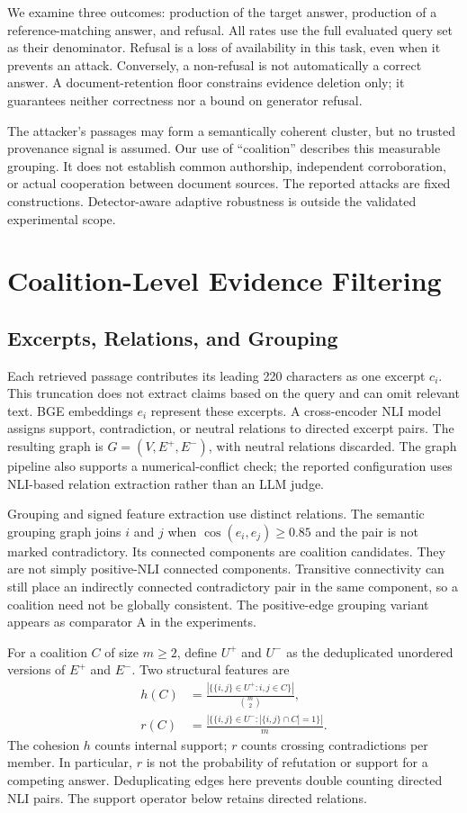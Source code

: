 \documentclass[sigconf]{aamas}
\begin{document}
We examine three outcomes: production of the target answer, production of a reference-matching answer, and refusal. All rates use the full evaluated query set as their denominator. Refusal is a loss of availability in this task, even when it prevents an attack. Conversely, a non-refusal is not automatically a correct answer. A document-retention floor constrains evidence deletion only; it guarantees neither correctness nor a bound on generator refusal.

The attacker's passages may form a semantically coherent cluster, but no trusted provenance signal is assumed. Our use of ``coalition'' describes this measurable grouping. It does not establish common authorship, independent corroboration, or actual cooperation between document sources. The reported attacks are fixed constructions. Detector-aware adaptive robustness is outside the validated experimental scope.

\section{Coalition-Level Evidence Filtering}
\label{sec:method}
\subsection{Excerpts, Relations, and Grouping}
Each retrieved passage contributes its leading 220 characters as one excerpt $c_i$. This truncation does not extract claims based on the query and can omit relevant text. BGE embeddings $e_i$ represent these excerpts. A cross-encoder NLI model assigns support, contradiction, or neutral relations to directed excerpt pairs. The resulting graph is $G=(V,E^+,E^-)$, with neutral relations discarded. The graph pipeline also supports a numerical-conflict check; the reported configuration uses NLI-based relation extraction rather than an LLM judge.

Grouping and signed feature extraction use distinct relations. The semantic grouping graph joins $i$ and $j$ when $\cos(e_i,e_j)\geq0.85$ and the pair is not marked contradictory. Its connected components are coalition candidates. They are not simply positive-NLI connected components. Transitive connectivity can still place an indirectly connected contradictory pair in the same component, so a coalition need not be globally consistent. The positive-edge grouping variant appears as comparator A in the experiments.

For a coalition $C$ of size $m\geq2$, define $U^+$ and $U^-$ as the deduplicated unordered versions of $E^+$ and $E^-$. Two structural features are
\begin{align}
h(C)&=\frac{|\{\{i,j\}\in U^+:i,j\in C\}|}{\binom{m}{2}},\\
r(C)&=\frac{|\{\{i,j\}\in U^-:|\{i,j\}\cap C|=1\}|}{m}.
\end{align}
The cohesion $h$ counts internal support; $r$ counts crossing contradictions per member. In particular, $r$ is not the probability of refutation or support for a competing answer. Deduplicating edges here prevents double counting directed NLI pairs. The support operator below retains directed relations.
\end{document}
